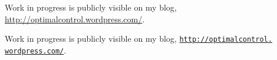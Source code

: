 \documentclass{article}
\begin{document}
Work in progress is publicly visible on my blog,
\url{http://optimalcontrol.wordpress.com/}.

Work in progress is publicly visible on my blog,
\href{http://optimalcontrol.wordpress.com/}{%
\texttt{http://optimalcontrol.\\wordpress.com/}}.
\end{document}
